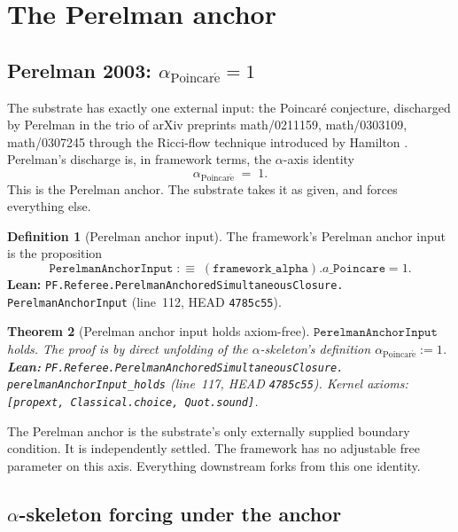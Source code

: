 \documentclass[11pt,a4paper]{article}
\theoremstyle{plain}
\newtheorem{theorem}{Theorem}[section]
\theoremstyle{definition}
\newtheorem{definition}[theorem]{Definition}
\begin{document}
\section{The Perelman anchor}
\label{sec:perelman-anchor}

\subsection{Perelman 2003: \texorpdfstring{$\alpha_{\mathrm{Poincar\acute e}} = 1$}{a\_Poincare = 1}}
\label{sec:perelman}

The substrate has exactly one external input: the
Poincar\'e conjecture, discharged by Perelman in the trio
of arXiv preprints
math/0211159, math/0303109, math/0307245 \cite{perelman2002,perelman2003a,perelman2003b}
through the Ricci-flow technique
introduced by Hamilton \cite{hamilton1982}.
Perelman's discharge is, in framework terms, the $\alpha$-axis
identity
\[
\alpha_{\mathrm{Poincar\acute e}} \;=\; 1.
\]
This is the Perelman anchor. The substrate takes it as given, and
forces everything else.

\begin{definition}[Perelman anchor input]
\label{def:perelman-anchor}
The framework's Perelman anchor input is the proposition
\[
\mathtt{PerelmanAnchorInput} \;:\equiv\;
(\mathtt{framework\_alpha}).a\_\mathtt{Poincare} = 1.
\]
\textbf{Lean:}
\texttt{PF.Referee.PerelmanAnchoredSimultaneousClosure.\\
PerelmanAnchorInput}
(line~112, HEAD \texttt{4785c55}).
\end{definition}

\begin{theorem}[Perelman anchor input holds axiom-free]
\label{thm:perelman-holds}
$\mathtt{PerelmanAnchorInput}$ holds. The proof is by direct
unfolding of the $\alpha$-skeleton's definition
$\alpha_{\mathrm{Poincar\acute e}} := 1$.
\textbf{Lean:}
\texttt{PF.Referee.PerelmanAnchoredSimultaneousClosure.\\
perelmanAnchorInput\_holds}
(line~117, HEAD \texttt{4785c55}). Kernel axioms:
\texttt{[propext, Classical.choice, Quot.sound]}.
\end{theorem}

The Perelman anchor is the substrate's only externally supplied
boundary condition. It is independently settled. The framework has
no adjustable free parameter on this axis. Everything downstream
forks from this one identity.

\subsection{$\alpha$-skeleton forcing under the anchor}
\label{sec:alpha-forcing}
\end{document}
